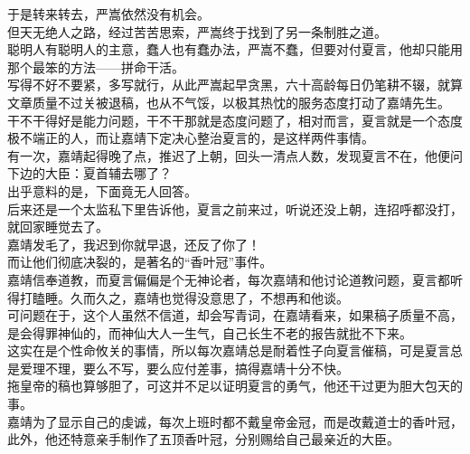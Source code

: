 \begin{multicols}{\theparacolNo}
于是转来转去，严嵩依然没有机会。\\

但天无绝人之路，经过苦苦思索，严嵩终于找到了另一条制胜之道。\\

聪明人有聪明人的主意，蠢人也有蠢办法，严嵩不蠢，但要对付夏言，他却只能用那个最笨的方法——拼命干活。\\

写得不好不要紧，多写就行，从此严嵩起早贪黑，六十高龄每日仍笔耕不辍，就算文章质量不过关被退稿，也从不气馁，以极其热忱的服务态度打动了嘉靖先生。\\

干不干得好是能力问题，干不干那就是态度问题了，相对而言，夏言就是一个态度极不端正的人，而让嘉靖下定决心整治夏言的，是这样两件事情。\\

有一次，嘉靖起得晚了点，推迟了上朝，回头一清点人数，发现夏言不在，他便问下边的大臣：夏首辅去哪了？\\

出乎意料的是，下面竟无人回答。\\

后来还是一个太监私下里告诉他，夏言之前来过，听说还没上朝，连招呼都没打，就回家睡觉去了。\\

嘉靖发毛了，我迟到你就早退，还反了你了！\\

而让他们彻底决裂的，是著名的“香叶冠”事件。\\

嘉靖信奉道教，而夏言偏偏是个无神论者，每次嘉靖和他讨论道教问题，夏言都听得打瞌睡。久而久之，嘉靖也觉得没意思了，不想再和他谈。\\

可问题在于，这个人虽然不信道，却会写青词，在嘉靖看来，如果稿子质量不高，是会得罪神仙的，而神仙大人一生气，自己长生不老的报告就批不下来。\\

这实在是个性命攸关的事情，所以每次嘉靖总是耐着性子向夏言催稿，可是夏言总是爱理不理，要么不写，要么应付差事，搞得嘉靖十分不快。\\

拖皇帝的稿也算够胆了，可这并不足以证明夏言的勇气，他还干过更为胆大包天的事。\\

嘉靖为了显示自己的虔诚，每次上班时都不戴皇帝金冠，而是改戴道士的香叶冠，此外，他还特意亲手制作了五顶香叶冠，分别赐给自己最亲近的大臣。\\


\end{multicols}
